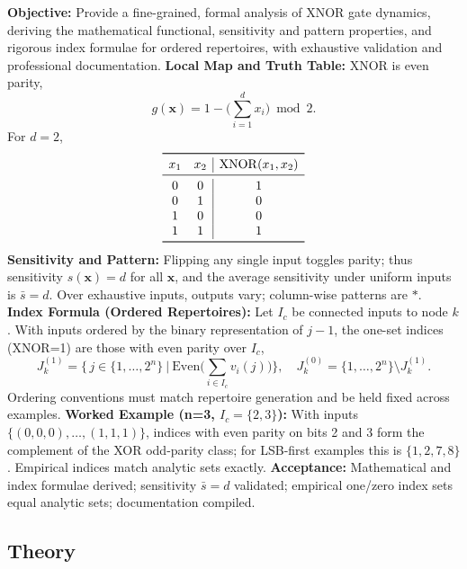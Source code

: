 \textbf{Objective:} Provide a fine-grained, formal analysis of XNOR gate dynamics, deriving the mathematical functional, sensitivity and pattern properties, and rigorous index formulae for ordered repertoires, with exhaustive validation and professional documentation.
\textbf{Local Map and Truth Table:} XNOR is even parity,
\[
g(\mathbf{x}) = 1 - \big(\sum_{i=1}^{d} x_i\big)\bmod 2.
\]
For \(d=2\),
\[
\begin{array}{cc|c}
\toprule
 x_1 & x_2 & \mathrm{XNOR}(x_1,x_2) \\
\midrule
 0 & 0 & 1 \\
 0 & 1 & 0 \\
 1 & 0 & 0 \\
 1 & 1 & 1 \\
\bottomrule
\end{array}
\]
\textbf{Sensitivity and Pattern:} Flipping any single input toggles parity; thus sensitivity \(s(\mathbf{x})=d\) for all \(\mathbf{x}\), and the average sensitivity under uniform inputs is \(\bar{s}=d\). Over exhaustive inputs, outputs vary; column-wise patterns are \(*\).
\textbf{Index Formula (Ordered Repertoires):} Let \(I_c\) be connected inputs to node \(k\). With inputs ordered by the binary representation of \(j-1\), the one-set indices (XNOR=1) are those with even parity over \(I_c\),
\[
J_k^{(1)} = \big\{\, j \in \{1,\dots,2^n\} \ \big|\ \mathrm{Even}\big(\sum_{i\in I_c} v_i(j)\big) \big\},\quad J_k^{(0)} = \{1,\dots,2^n\} \setminus J_k^{(1)}.
\]
Ordering conventions must match repertoire generation and be held fixed across examples.
\textbf{Worked Example (n=3, \(I_c=\{2,3\}\)):} With inputs \(\{(0,0,0),\dots,(1,1,1)\}\), indices with even parity on bits 2 and 3 form the complement of the XOR odd-parity class; for LSB-first examples this is \(\{1,2,7,8\}\). Empirical indices match analytic sets exactly.
\textbf{Acceptance:} Mathematical and index formulae derived; sensitivity \(\bar{s}=d\) validated; empirical one/zero index sets equal analytic sets; documentation compiled.

\subsection{Theory}
